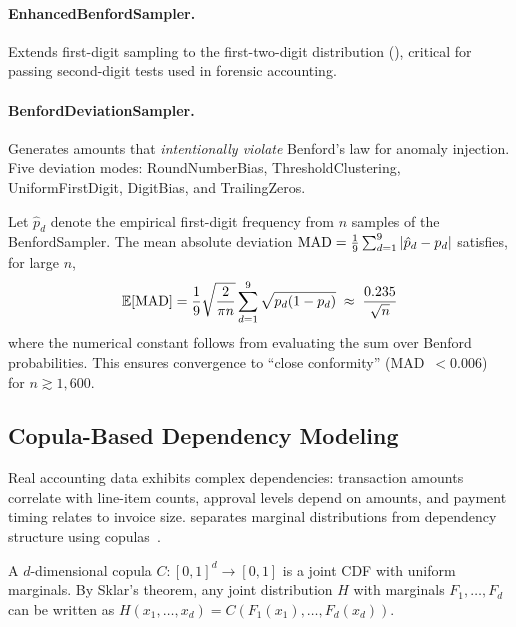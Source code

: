 \paragraph{EnhancedBenfordSampler.}
Extends first-digit sampling to the first-two-digit distribution
(), critical for passing second-digit tests used
in forensic accounting.

\paragraph{BenfordDeviationSampler.}
Generates amounts that \emph{intentionally violate} Benford's law for
anomaly injection.  Five deviation modes: RoundNumberBias,
ThresholdClustering, UniformFirstDigit, DigitBias, and TrailingZeros.

\begin{proposition}
\label{prop:mad}
Let $\hat{p}_d$ denote the empirical first-digit frequency from $n$
samples of the BenfordSampler.  The mean absolute deviation
$\operatorname{MAD} = \frac{1}{9}\sum_{d=1}^{9}|\hat{p}_d - p_d|$ satisfies, for
large $n$,
\[
\mathbb{E}[\operatorname{MAD}] = \frac{1}{9}\sqrt{\frac{2}{\pi n}}
  \sum_{d=1}^{9}\sqrt{p_d(1-p_d)}
  \;\approx\; \frac{0.235}{\sqrt{n}}
\]
where the numerical constant follows from evaluating the sum over
Benford probabilities.  This ensures convergence to ``close
conformity'' (MAD~$< 0.006$)~\citep{nigrini2012benfords} for
$n \gtrsim 1{,}600$.
\end{proposition}

\subsection{Copula-Based Dependency Modeling}
\label{sec:stat_copula}

Real accounting data exhibits complex dependencies: transaction amounts
correlate with line-item counts, approval levels depend on amounts, and
payment timing relates to invoice size.  \system{} separates marginal
distributions from dependency structure using
copulas~\citep{nelsen2006introduction}.

\begin{definition}[Copula]
A $d$-dimensional copula $C : [0,1]^d \to [0,1]$ is a joint CDF with
uniform marginals.  By Sklar's theorem, any joint distribution $H$ with
marginals $F_1, \ldots, F_d$ can be written as
$H(x_1, \ldots, x_d) = C(F_1(x_1), \ldots, F_d(x_d))$.
\end{definition}

